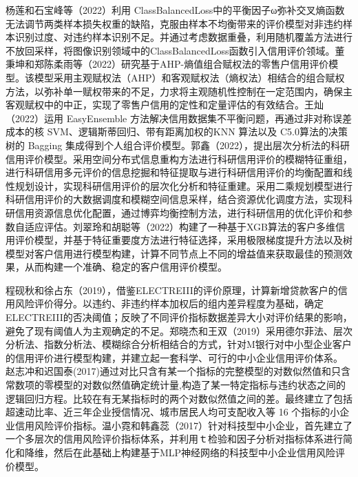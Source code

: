 杨莲和石宝峰等（2022）利用 ClassBalancedLoss中的平衡因子ω弥补交叉熵函数无法调节两类样本损失权重的缺陷，克服由样本不均衡带来的评价模型对非违约样本识别过度、对违约样本识别不足。并通过考虑数据重叠，利用随机覆盖方法进行不放回采样，将图像识别领域中的ClassBalancedLoss函数引入信用评价领域。董秉坤和郑陈柔雨等（2022）研究基于AHP-熵值组合赋权法的零售户信用评价模型。该模型采用主观赋权法（AHP）和客观赋权法（熵权法）相结合的组合赋权方法，以弥补单一赋权带来的不足，力求将主观随机性控制在一定范围内，确保主客观赋权中的中正，实现了零售户信用的定性和定量评估的有效结合。王灿（2022）运用 EasyEnsemble 方法解决信用数据集不平衡问题，再通过非对称误差成本的核 SVM、逻辑斯蒂回归、带有距离加权的KNN 算法以及 C5.0算法的决策树的 Bagging 集成得到个人组合评价模型。郭鑫（2022），提出层次分析法的科研信用评价模型。采用空间分布式信息重构方法进行科研信用评价的模糊特征重组，进行科研信用多元评价的信息挖掘和特征提取与进行科研信用评价的均衡配置和线性规划设计，实现科研信用评价的层次化分析和特征重建。采用二乘规划模型进行科研信用评价的大数据调度和模糊空间信息采样，结合资源优化调度方法，实现科研信用资源信息优化配置，通过博弈均衡控制方法，进行科研信用的优化评价和参数自适应评估。刘翠玲和胡聪等（2022）构建了一种基于XGB算法的客户多维信用评价模型，并基于特征重要度方法进行特征选择，采用极限梯度提升方法以及树模型对客户信用进行模型构建，计算不同节点上不同的增益值来获取最佳的预测效果，从而构建一个准确、稳定的客户信用评价模型。

程砚秋和徐占东（2019），借鉴ELECTREIII的评价原理，计算新增贷款客户的信用风险评价得分。以违约、非违约样本加权后的组内差异程度为基础，确定ELECTREIII的否决阈值；反映了不同评价指标数据差异大小对评价结果的影响，避免了现有阈值人为主观确定的不足。郑晓杰和王双（2019）采用德尔菲法、层次分析法、指数分析法、模糊综合分析相结合的方式，针对M银行对中小型企业客户的信用评价进行模型构建，并建立起一套科学、可行的中小企业信用评价体系。
赵志冲和迟国泰(2017)通过对比只含有某一个指标的完整模型的对数似然值和只含常数项的零模型的对数似然值确定统计量,构造了某一特定指标与违约状态之间的逻辑回归方程。比较在有无某指标时的两个对数似然值之间的差。最终建立了包括超速动比率、近三年企业授信情况、城市居民人均可支配收入等 16 个指标的小企业信用风险评价指标。温小霓和韩鑫蕊（2017）针对科技型中小企业，首先建立了一个多层次的信用风险评价指标体系，并利用ｔ检验和因子分析对指标体系进行简化和降维，然后在此基础上构建基于MLP神经网络的科技型中小企业信用风险评价模型。

